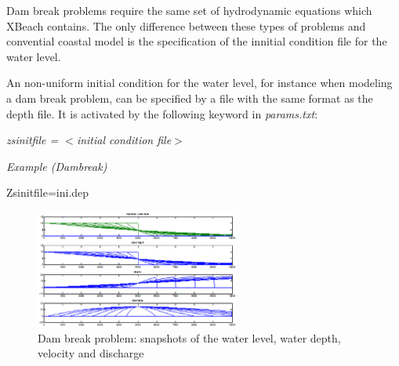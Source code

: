 Dam break problems require the same set of hydrodynamic equations which XBeach contains. The only difference between these types of problems and convential coastal model is the specification of the innitial condition file for the water level.

An non-uniform initial condition for the water level, for instance when modeling a dam break problem, can be specified by a file with the same format as the depth file. It is activated by the following keyword in \textit{params.txt}:

\textit{zsinitfile = $<$initial condition file$>$}

\textit{Example (Dambreak)}

Zsinitfile=ini.dep

\begin{figure}[h]
  \centering
  \includegraphics[width=0.6\textwidth]{image23}
  \caption{Dam break problem: snapshots of the water level, water depth, velocity and discharge}
  \label{fig:image23}
\end{figure}

